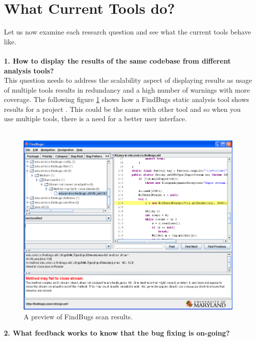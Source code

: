 \section{What Current Tools do?}

Let us now examine each research question and see what the current tools behave like. \\ \\

\textbf{1. How to display the results of the same codebase from different analysis tools?}  \\

This question needs to address the scalability aspect of displaying results as usage of multiple tools results in redundancy and a high number of warnings with more coverage. The following figure \ref{fig:findbugs-results} shows how a FindBugs \cite{findbugs} static analysis tool shows results for a project \cite{findbugs-example}. This could be the same with other tool and so when you use multiple tools, there is a need for a better user interface.\\ \\

\begin{figure}[hbt!]
	\centering
	\includegraphics[width=\linewidth]{figures/findbugs-results}
	\caption{A preview of FindBugs scan results.}
	\label{fig:findbugs-results}
\end{figure}

\clearpage

\textbf{2. What feedback works to know that the bug fixing is on-going?} \\

